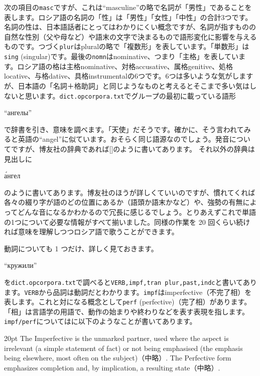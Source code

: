 \documentclass[12pt]{ltjsarticle}
\begin{document}
次の項目の\texttt{masc}ですが、これは“masculine”の略で名詞が「男性」であることを表します。ロシア語の名詞の「性」は「男性」「女性」「中性」の合計3つです。名詞の性は、日本語話者にとってはわかりにくい概念ですが、名詞が指すものの自然な性別（父や母など）や語末の文字で決まるもので語形変化に影響を与えるものです。つづく\texttt{plur}はpluralの略で「複数形」を表しています。「単数形」は\texttt{sing} (singular)です。最後の\texttt{nomn}はnominative、つまり「主格」を表しています。ロシア語の格は主格nominative、対格accusative、属格genitive、処格locative、与格dative、具格instrumentalの6つです。6つは多いような気がしますが、日本語の「名詞＋格助詞」と同じようなものと考えるとそこまで多い気はしないと思います。\texttt{dict.opcorpora.txt}でグループの最初に載っている語形\begin{russian}“ангелы”\end{russian}で辞書を引き、意味を調べます。「天使」だそうです。確かに、そう言われてみると英語の“angel”に似ています。おそらく同じ語源なのでしょう。発音についてですが、博友社の辞典であれば[]のように書いてあります。
それ以外の辞典は見出しに\begin{russian}\'{а}нгел\end{russian}のように書いてあります。博友社のほうが詳しくていいのですが、慣れてくれば各々の綴り字が語のどの位置にあるか（語頭か語末かなど）や、強勢の有無によってどんな音になるかわかるので冗長に感じるでしょう。とりあえずこれで単語の1つについて必要な情報がすべて揃いました。同様の作業を 20 回くらい続ければ意味を理解しつつロシア語で歌うことができます。

動詞についても 1 つだけ、詳しく見ておきます。\begin{russian}“кружили”\end{russian}を\texttt{dict.opcorpora.txt}で調べると\texttt{VERB,impf,tran plur,past,indc}と書いてあります。\texttt{VERB}から品詞は動詞だとわかります。\texttt{impf}はimperfective（不完了相）を表します。これと対になる概念として\texttt{perf} (perfective)（完了相）があります。
「相」は言語学の用語で、動作の始まりや終わりなどを表す表現を指します。\texttt{impf/perf}については\citep[p. 151]{cubberley2002}に以下のようなことが書いてあります。

\bigskip

\begin{indentation}{2\zw}{0pt}
The Imperfective is the unmarked partner, used where the aspect is irrelevant (a simple statement of fact) or not being emphasised (the emphasis being elsewhere, most often on the subject)（中略）. The Perfective form emphasizes completion and, by implication, a resulting state（中略）.
\end{indentation}
\end{document}
